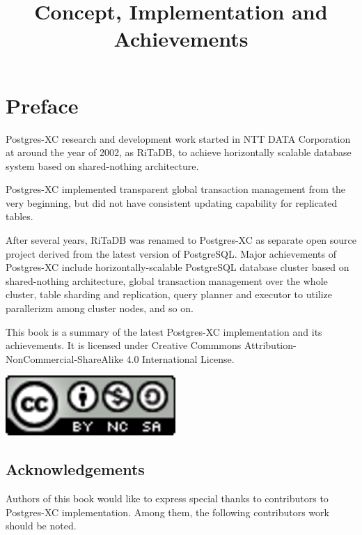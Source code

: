 \documentclass[10pt,a4paper]{book}
\title{\XC{} Concept, Implementation and Achievements}
\date{\ReleaseDate{}}
\author{\Author}
\newcommand{\XC}{Postgres-XC}
\newcommand{\PG}{PostgreSQL}
\begin{document}
\maketitle

\newpage
\tableofcontents
\newpage

%
%
\frontmatter

\chapter{Preface}

\XC{} research and development work started in NTT DATA Corporation at around the year of 2002,
as RiTaDB, to achieve horizontally scalable database system based on shared-nothing architecture.

\XC{} implemented transparent global transaction management from the very beginning, but did not
have consistent updating capability for replicated tables.

After several years, RiTaDB was renamed to \XC{} as separate open source project derived from
the latest version of \PG.
Major achievements of \XC{} include horizontally-scalable PostgreSQL database cluster based on
shared-nothing architecture, global transaction management over the whole cluster,
table sharding and replication,
query planner and executor to utilize parallerizm among cluster nodes, and so on.

This book is a summary of the latest \XC{} implementation and its achievements.
It is licensed under Creative Commmons
Attribution-NonCommercial-ShareAlike 4.0 International License.

\begin{flushright}
	\includegraphics[width=0.15\hsize]{88x31.eps}
\end{flushright}

\section*{Acknowledgements}

Authors of this book would like to express special thanks to contributors to \XC{} implementation.
Among them, the following contributors work should be noted.
\end{document}
